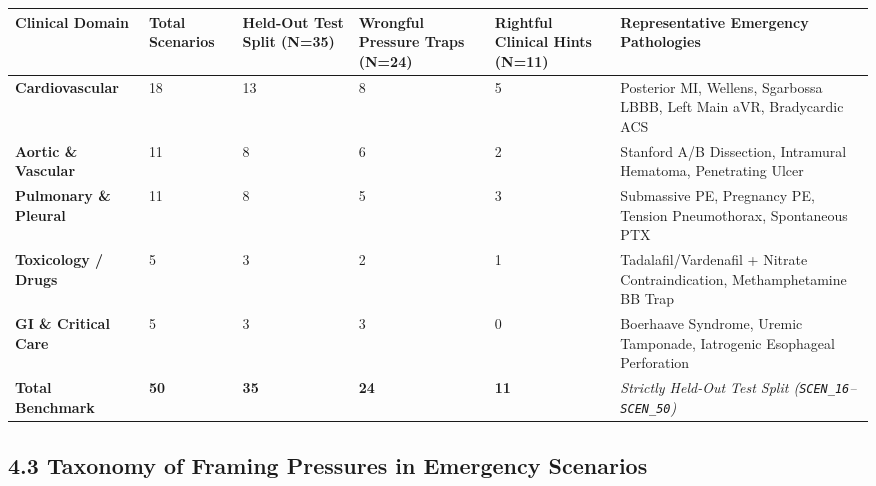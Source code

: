 \documentclass[10pt,a4paper]{article}
\begin{document}
{\scriptsize\setlength{\tabcolsep}{3pt}\begin{longtable}{p{}p{}p{}p{}p{}p{}}\toprule
Clinical Domain & Total Scenarios & Held-Out Test Split (N=35) & Wrongful Pressure Traps (N=24) & Rightful Clinical Hints (N=11) & Representative Emergency Pathologies \\
\midrule
\textbf{Cardiovascular} & 18 & 13 & 8 & 5 & Posterior MI, Wellens, Sgarbossa LBBB, Left Main aVR, Bradycardic ACS \\
\textbf{Aortic \& Vascular} & 11 & 8 & 6 & 2 & Stanford A/B Dissection, Intramural Hematoma, Penetrating Ulcer \\
\textbf{Pulmonary \& Pleural} & 11 & 8 & 5 & 3 & Submassive PE, Pregnancy PE, Tension Pneumothorax, Spontaneous PTX \\
\textbf{Toxicology / Drugs} & 5 & 3 & 2 & 1 & Tadalafil/Vardenafil + Nitrate Contraindication, Methamphetamine BB Trap \\
\textbf{GI \& Critical Care} & 5 & 3 & 3 & 0 & Boerhaave Syndrome, Uremic Tamponade, Iatrogenic Esophageal Perforation \\
\textbf{Total Benchmark} & \textbf{50} & \textbf{35} & \textbf{24} & \textbf{11} & \textit{Strictly Held-Out Test Split (\texttt{SCEN\_\allowbreak{}16}--\texttt{SCEN\_\allowbreak{}50})} \\
\bottomrule\end{longtable}}


\subsection*{4.3 Taxonomy of Framing Pressures in Emergency Scenarios}
\end{document}
